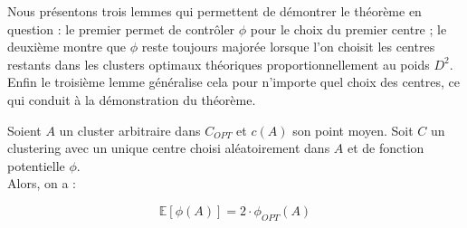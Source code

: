 \documentclass[12pt,a4paper]{book}
\newcommand{\E}{\mathbb{E}}
\newcommand{\1}{\mathds{1}}
\begin{document}
Nous présentons trois lemmes qui permettent de démontrer le théorème en question : le premier permet de contrôler $\phi$ pour le choix du premier centre ; le deuxième montre que $\phi$ reste toujours majorée lorsque l'on choisit les centres restants dans les clusters optimaux théoriques proportionnellement au poids $D^2$. Enfin le troisième lemme généralise cela pour n'importe quel choix des centres, ce qui conduit à la démonstration du théorème.

	\begin{env_lemme}\label{lemme3.1}
		Soient $A$ un cluster arbitraire dans $C_{OPT}$ et $c(A)$ son point moyen. Soit $C$ un clustering avec un unique centre choisi aléatoirement dans $A$ et de fonction potentielle $\phi$.\\
		Alors, on a :
		
		$$
			\E\left[\phi(A)\right] = 2 \cdot \phi_{OPT} \left( A \right)
		$$		
	\end{env_lemme}	
	
\end{document}

